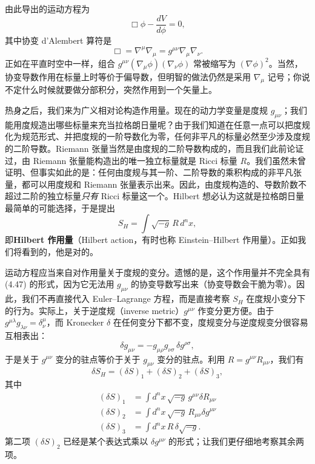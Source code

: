 由此导出的运动方程为
\begin{equation*}
\Box\phi - \frac{dV}{d\phi} = 0,
\tag{4.53}
\end{equation*}
其中协变 d'Alembert 算符是
\begin{equation*}
\Box = \nabla^\mu\nabla_\mu = g^{\mu\nu}\nabla_\mu\nabla_\nu.
\tag{4.54}
\end{equation*}
正如在平直时空中一样，组合 $g^{\mu\nu}(\nabla_\mu\phi)(\nabla_\nu\phi)$ 常被缩写为 $(\nabla\phi)^2$。当然，协变导数作用在标量上时等价于偏导数，但明智的做法仍然是采用 $\nabla_\mu$ 记号；你说不定什么时候就要做分部积分，突然作用到一个矢量上。

热身之后，我们来为广义相对论构造作用量。现在的动力学变量是度规 $g_{\mu\nu}$；我们能用度规造出哪些标量来充当拉格朗日量呢？由于我们知道在任意一点可以把度规化为规范形式、并把度规的一阶导数化为零，任何非平凡的标量必然至少涉及度规的二阶导数。Riemann 张量当然是由度规的二阶导数构成的，而且我们此前论证过，由 Riemann 张量能构造出的唯一独立标量就是 Ricci 标量 $R$。我们虽然未曾证明、但事实如此的是：任何由度规与其一阶、二阶导数的乘积构成的非平凡张量，都可以用度规和 Riemann 张量表示出来。因此，由度规构造的、导数阶数不超过二阶的独立标量\emph{只有} Ricci 标量这一个。Hilbert 想必认为这就是拉格朗日量最简单的可能选择，于是提出
\begin{equation*}
S_H = \int\sqrt{-g}\, R\, d^nx,
\tag{4.55}
\end{equation*}
即\textbf{Hilbert 作用量}（Hilbert action，有时也称 Einstein--Hilbert 作用量）。正如我们将看到的，他是对的。

运动方程应当来自对作用量关于度规的变分。遗憾的是，这个作用量并不完全具有 (4.47) 的形式，因为它无法用 $g_{\mu\nu}$ 的协变导数写出来（协变导数会干脆为零）。因此，我们不再直接代入 Euler--Lagrange 方程，而是直接考察 $S_H$ 在度规小变分下的行为。实际上，关于逆度规（inverse metric）$g^{\mu\nu}$ 作变分更方便。由于 $g^{\mu\lambda}g_{\lambda\nu}=\delta^\mu_\nu$，而 Kronecker $\delta$ 在任何变分下都不变，度规变分与逆度规变分很容易互相表出：
\begin{equation*}
\delta g_{\mu\nu} = -g_{\mu\rho}g_{\nu\sigma}\,\delta g^{\rho\sigma},
\tag{4.56}
\end{equation*}
于是关于 $g^{\mu\nu}$ 变分的驻点等价于关于 $g_{\mu\nu}$ 变分的驻点。利用 $R=g^{\mu\nu}R_{\mu\nu}$，我们有
\begin{equation*}
\delta S_H = (\delta S)_1 + (\delta S)_2 + (\delta S)_3,
\tag{4.57}
\end{equation*}
其中
\begin{align*}
(\delta S)_1 &= \int d^nx\,\sqrt{-g}\, g^{\mu\nu}\delta R_{\mu\nu} \\
(\delta S)_2 &= \int d^nx\,\sqrt{-g}\, R_{\mu\nu}\delta g^{\mu\nu} \\
(\delta S)_3 &= \int d^nx\, R\,\delta\sqrt{-g}.
\tag{4.58}
\end{align*}
第二项 $(\delta S)_2$ 已经是某个表达式乘以 $\delta g^{\mu\nu}$ 的形式；让我们更仔细地考察其余两项。

